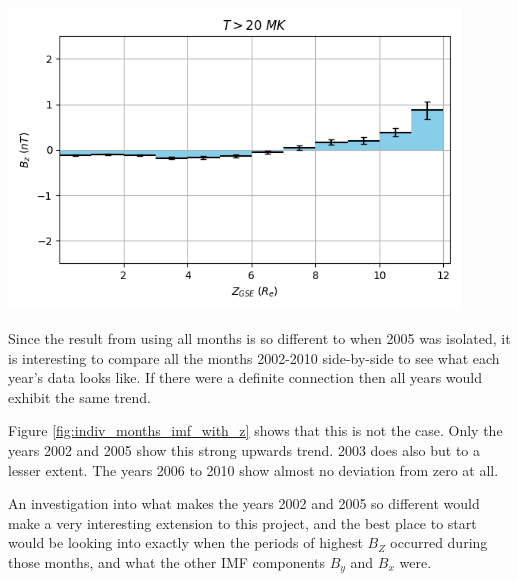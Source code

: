 \documentclass[12pt]{article}
\newenvironment{Figure}
  {\par\medskip\noindent\minipage{\linewidth}}
  {\endminipage\par\medskip}
\begin{document}
\begin{Figure}
    \begin{minipage}[c]{0.57\textwidth}
        \centering
        \includegraphics[width=0.9\textwidth]{imf_with_z.png}
    \end{minipage}
    \begin{minipage}[c]{0.4\textwidth}
        \label{fig:imf_with_z}
    \end{minipage}
\end{Figure}

Since the result from using all months is so different to when 2005 was isolated, it is interesting to compare all the months 2002-2010 side-by-side to see what each year's data looks like. If there were a definite connection then all years would exhibit the same trend.

Figure \ref{fig:indiv_months_imf_with_z} shows that this is not the case. Only the years 2002 and 2005 show this strong upwards trend. 2003 does also but to a lesser extent. The years 2006 to 2010 show almost no deviation from zero at all.

An investigation into what makes the years 2002 and 2005 so different would make a very interesting extension to this project, and the best place to start would be looking into exactly when the periods of highest $B_Z$ occurred during those months, and what the other IMF components $B_y$ and $B_x$ were.
\end{document}
